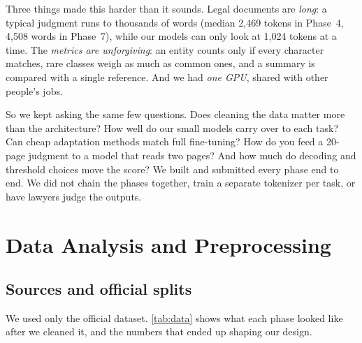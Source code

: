 \documentclass[11pt, oneside]{article}
\begin{document}
Three things made this harder than it sounds.  Legal documents are \emph{long}: a typical judgment runs to
thousands of words (median 2,469 tokens in Phase~4, 4,508 words in Phase~7), while our models can only look at
1,024 tokens at a time.  The \emph{metrics are unforgiving}: an entity counts only if every character matches,
rare classes weigh as much as common ones, and a summary is compared with a single reference.  And we had
\emph{one GPU}, shared with other people's jobs.

So we kept asking the same few questions.  Does cleaning the data matter more than the architecture?  How well
do our small models carry over to each task?  Can cheap adaptation methods match full fine-tuning?  How do you
feed a 20-page judgment to a model that reads two pages?  And how much do decoding and threshold choices move
the score?  We built and submitted every phase end to end.  We did not chain the phases together, train a
separate tokenizer per task, or have lawyers judge the outputs.

\section{Data Analysis and Preprocessing}
\subsection{Sources and official splits}
We used only the official dataset.  \autoref{tab:data} shows what each phase looked like after we cleaned it,
and the numbers that ended up shaping our design.
\end{document}
